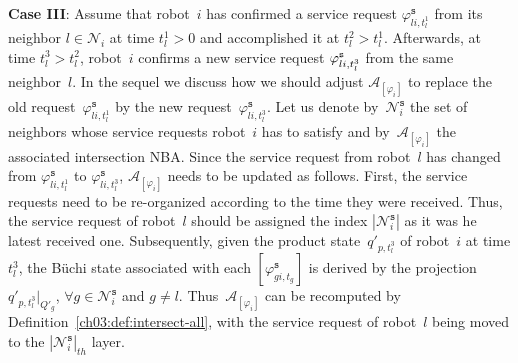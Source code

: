 \textbf{Case III}: Assume that robot~$i$ has confirmed a service request $\varphi_{li,t^1_l}^\texttt{s}$ from its neighbor $l\in \mathcal{N}_i$ at time $t^1_l>0$ and accomplished it at $t^2_l>t_l^1$. Afterwards, at time $t^3_l>t_l^2$, robot~$i$ confirms a new service request  $\varphi_{li,t_l^3}^{\textup{\texttt{s}}}$ from the same neighbor~$l$.
In the sequel we discuss how we should adjust $\mathcal{A}_{[\varphi_i]}$ to replace the old request~$\varphi_{li,t^1_l}^\texttt{s}$ by the new request~$\varphi_{li,t^3_l}^\texttt{s}$.
Let us denote by~$\mathcal{N}_i^\texttt{s}$ the set of neighbors whose service requests robot~$i$ has to satisfy and by~${\mathcal{A}}_{[\varphi_i]}$ the associated intersection NBA.
Since the service request from robot~$l$ has changed from $\varphi_{li,t^1_l}^\texttt{s}$ to $\varphi_{li,t^3_l}^\texttt{s}$, ${\mathcal{A}}_{[\varphi_i]}$ needs to be updated as follows.
First, the service requests need to be re-organized according to the time they were received. Thus, the service request of robot~$l$ should be assigned the index $|\mathcal{N}_i^\texttt{s}|$ as it was he latest received one.
Subsequently, given the product state~$q'_{p,t_l^3}$ of robot~$i$ at time $t_l^3$, the B\"uchi state associated with each $[\varphi_{gi,t_g}^{\texttt{s}}]$ is derived by the projection $q'_{p,t_l^3}|_{Q'_g}$, $\forall g \in \mathcal{N}_i^\texttt{s}$ and $g\neq l$. Thus~${\mathcal{A}}_{[\varphi_i]}$ can be recomputed by Definition~\ref{ch03:def:intersect-all}, with the service request of robot~$l$ being moved to the $|\mathcal{N}_i^\texttt{s}|_{th}$ layer.


